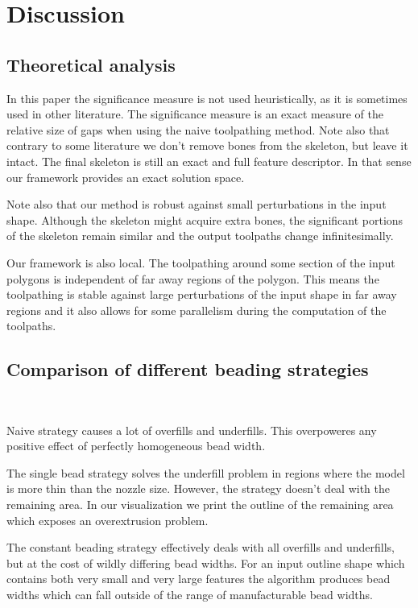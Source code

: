 \section{Discussion}

\subsection{Theoretical analysis}
In this paper the significance measure is not used heuristically, as it is sometimes used in other literature.
The significance measure is an exact measure of the relative size of gaps when using the naive toolpathing method.
Note also that contrary to some literature we don't remove bones from the skeleton, but leave it intact.
The final skeleton is still an exact and full feature descriptor.
In that sense our framework provides an exact solution space.

Note also that our method is robust against small perturbations in the input shape.
Although the skeleton might acquire extra bones, the significant portions of the skeleton remain similar and the output toolpaths change infinitesimally.

Our framework is also local.
The toolpathing around some section of the input polygons is independent of far away regions of the polygon.
This means the toolpathing is stable against large perturbations of the input shape in far away regions
and it also allows for some parallelism during the computation of the toolpaths.


\subsection{Comparison of different beading strategies}
\

Naive strategy causes a lot of overfills and underfills.
This overpoweres any positive effect of perfectly homogeneous bead width.

The single bead strategy solves the underfill problem in regions where the model is more thin than the nozzle size.
However, the strategy doesn't deal with the remaining area.
In our visualization we print the outline of the remaining area which exposes an overextrusion problem.

The constant beading strategy effectively deals with all overfills and underfills, but at the cost of wildly differing bead widths.
For an input outline shape which contains both very small and very large features the algorithm produces bead widths which can fall outside of the range of manufacturable bead widths.

